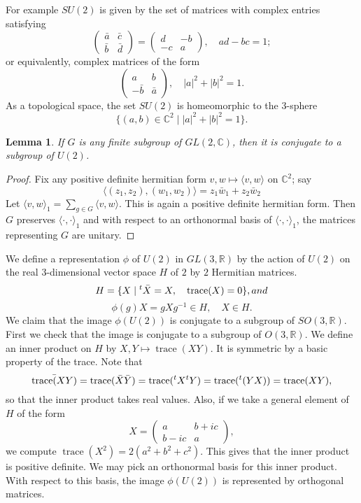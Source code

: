 \documentclass{amsart}
\def\op#1{{\operatorname{#1}}}
\newcommand{\ring}[1]{\mathbb{#1}}
\newtheorem{lemma}[equation]{Lemma}
\def\t#1{\hbox{}^t#1}
\begin{document}
For example $SU(2)$ is given by the set of matrices with complex entries satisfying
\[
\begin{pmatrix}{\bar a} & {\bar c} \\ \bar b & \bar d\end{pmatrix} = 
\begin{pmatrix}d & - b\\ -c & a \end{pmatrix},\quad ad - bc = 1;
\]
or equivalently, complex matrices of the form
\[
\begin{pmatrix}a & b\\ -\bar b & \bar a\end{pmatrix},\quad |a|^2 + |b|^2 = 1.
\]
As a topological space, the set $SU(2)$ is homeomorphic to
 the $3$-sphere 
$$\{(a,b)\in \ring{C}^2\mid |a|^2 + |b|^2 = 1\}.$$


\begin{lemma} If $G$ is any finite subgroup of $GL(2,\ring{C})$, then it is
conjugate to a subgroup of $U(2)$.
\end{lemma}

\begin{proof} Fix any positive definite hermitian form $v,w\mapsto \langle v,w\rangle $ on $\ring{C}^2$;
say 
\[\langle (z_1,z_2),(w_1,w_2)\rangle  = z_1 \bar w_1 + z_2 \bar w_2\]
Let $\langle v,w\rangle_1 = \sum_{g\in G} \langle v,w\rangle$.  This is again a positive definite
hermitian form.    Then $G$ preserves $\langle\cdot,\cdot\rangle_1$ and with respect 
to an orthonormal basis  of $\langle\cdot,\cdot\rangle_1$, the matrices representing $G$ are unitary.
\end{proof}

We define a representation $\phi$ of $U(2)$ in $GL(3,\ring{R})$ by the action of $U(2)$ on the real $3$-dimensional
 vector space $H$
of $2$ by $2$ Hermitian matrices.
\[
H = \{ X \mid \t{\bar X} = X,\quad \op{trace}(X)=0\}, and 
\]
  \[
   \phi(g) X = {g} X g^{-1} \in H, \quad X\in H.
  \]
We claim that the image $\phi(U(2))$ is conjugate to a subgroup of  $SO(3,\ring{R})$.
First we check that the image is conjugate to a subgroup of $O(3,\ring{R})$.  We define an inner product
on $H$ by  $X,Y\mapsto \op{trace}(XY)$.  It is symmetric by a basic property of the trace.  Note that 
\[
\bar {\op{trace}(XY)} = \op{trace}(\bar X \bar Y) = \op{trace}(\t{X}\t{Y}) = \op{trace}(\t{(YX)}) = \op{trace}(XY),
\]
so that the inner product takes real values.
Also, if we take a general element of $H$ of the form
\[
X = \begin{pmatrix} a & b + i c \\ b - i c & a\end{pmatrix},
\]
we compute $\op{trace}(X^2) = 2 (a^2 + b^2 + c^2)$.  This gives that the inner product is positive definite.  We may
pick an orthonormal basis for this inner product.  With respect to this basis, the image $\phi(U(2))$
is represented by orthogonal matrices.
\end{document}
